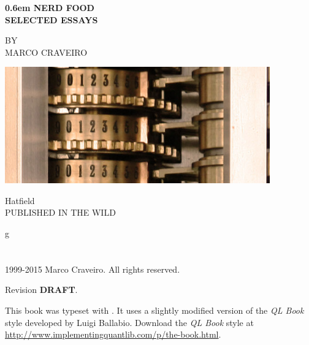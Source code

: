 \documentclass{book}
\begin{document}
\clearpage

\newcommand\nbvspace[1][3]{\vspace*{\stretch{#1}}}
\newcommand\nbstretchyspace{\spaceskip0.5em plus 0.25em minus 0.25em}
\newcommand{\nbtitlestretch}{\spaceskip0.6em}
\pagestyle{empty}
\begin{center}
\bfseries
\nbvspace[1]
\Huge
{\nbtitlestretch\huge
  NERD FOOD\\SELECTED ESSAYS}

\nbvspace[1]
\normalsize

\nbvspace[1]
\small BY\\
\Large MARCO CRAVEIRO\\[0.5em]

\nbvspace[2]

\begin{center}
  \includegraphics[width=4.5in]{difference_engine_cogs}
\end{center}
\nbvspace[3]
\normalsize

Hatfield\\
\large
PUBLISHED IN THE WILD
\nbvspace[1]
\end{center}

g%
%
\newpage
{}
\section*{}
\pagestyle{empty}
\vfill
\begingroup
\footnotesize
\parindent 0pt
\parskip \baselineskip

\textcopyright{} 1999-2015 Marco Craveiro. All rights reserved.

Revision \textbf{DRAFT}.

This book was typeset with \LaTeXe. It uses a slightly modified
version of the \textit{QL Book} style developed by Luigi Ballabio.
Download the \textit{QL Book} style at
\url{http://www.implementingquantlib.com/p/the-book.html}.
\end{document}
